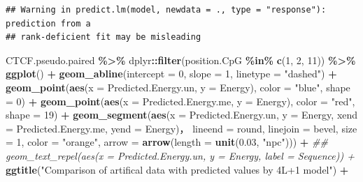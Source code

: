 \documentclass[
]{article}
\newenvironment{Shaded}{\begin{snugshade}}{\end{snugshade}}
\newcommand{\CommentTok}[1]{\textcolor[rgb]{0.56,0.35,0.01}{\textit{#1}}}
\newcommand{\DataTypeTok}[1]{\textcolor[rgb]{0.13,0.29,0.53}{#1}}
\newcommand{\DecValTok}[1]{\textcolor[rgb]{0.00,0.00,0.81}{#1}}
\newcommand{\FloatTok}[1]{\textcolor[rgb]{0.00,0.00,0.81}{#1}}
\newcommand{\KeywordTok}[1]{\textcolor[rgb]{0.13,0.29,0.53}{\textbf{#1}}}
\newcommand{\NormalTok}[1]{#1}
\newcommand{\OperatorTok}[1]{\textcolor[rgb]{0.81,0.36,0.00}{\textbf{#1}}}
\newcommand{\StringTok}[1]{\textcolor[rgb]{0.31,0.60,0.02}{#1}}
\begin{document}
\begin{verbatim}
## Warning in predict.lm(model, newdata = ., type = "response"): prediction from a
## rank-deficient fit may be misleading
\end{verbatim}

\begin{Shaded}
\begin{Highlighting}[]
\NormalTok{CTCF.pseudo.paired }\OperatorTok{\%\textgreater{}\%}
\StringTok{    }\NormalTok{dplyr}\OperatorTok{::}\KeywordTok{filter}\NormalTok{(position.CpG }\OperatorTok{\%in\%}\StringTok{ }\KeywordTok{c}\NormalTok{(}\DecValTok{1}\NormalTok{, }\DecValTok{2}\NormalTok{, }\DecValTok{11}\NormalTok{)) }\OperatorTok{\%\textgreater{}\%}
\StringTok{    }\KeywordTok{ggplot}\NormalTok{() }\OperatorTok{+}
\StringTok{    }\KeywordTok{geom\_abline}\NormalTok{(}\DataTypeTok{intercept =} \DecValTok{0}\NormalTok{, }\DataTypeTok{slope =} \DecValTok{1}\NormalTok{, }\DataTypeTok{linetype =} \StringTok{"dashed"}\NormalTok{) }\OperatorTok{+}
\StringTok{    }\KeywordTok{geom\_point}\NormalTok{(}\KeywordTok{aes}\NormalTok{(}\DataTypeTok{x =}\NormalTok{ Predicted.Energy.un, }\DataTypeTok{y =}\NormalTok{ Energy), }\DataTypeTok{color =} \StringTok{"blue"}\NormalTok{, }\DataTypeTok{shape =} \DecValTok{0}\NormalTok{) }\OperatorTok{+}
\StringTok{    }\KeywordTok{geom\_point}\NormalTok{(}\KeywordTok{aes}\NormalTok{(}\DataTypeTok{x =}\NormalTok{ Predicted.Energy.me, }\DataTypeTok{y =}\NormalTok{ Energy), }\DataTypeTok{color =} \StringTok{"red"}\NormalTok{, }\DataTypeTok{shape =} \DecValTok{19}\NormalTok{) }\OperatorTok{+}
\StringTok{    }\KeywordTok{geom\_segment}\NormalTok{(}\KeywordTok{aes}\NormalTok{(}\DataTypeTok{x =}\NormalTok{ Predicted.Energy.un, }\DataTypeTok{y =}\NormalTok{ Energy,}
                     \DataTypeTok{xend =}\NormalTok{ Predicted.Energy.me, }\DataTypeTok{yend =}\NormalTok{ Energy)，}
                 \DataTypeTok{lineend =} \StringTok{\textquotesingle{}round\textquotesingle{}}\NormalTok{, }\DataTypeTok{linejoin =} \StringTok{\textquotesingle{}bevel\textquotesingle{}}\NormalTok{, }\DataTypeTok{size =} \DecValTok{1}\NormalTok{, }\DataTypeTok{color =} \StringTok{"orange"}\NormalTok{,}
                 \DataTypeTok{arrow =} \KeywordTok{arrow}\NormalTok{(}\DataTypeTok{length =} \KeywordTok{unit}\NormalTok{(}\FloatTok{0.03}\NormalTok{, }\StringTok{"npc"}\NormalTok{))) }\OperatorTok{+}
\StringTok{   }\CommentTok{\#\# geom\_text\_repel(aes(x = Predicted.Energy.un, y = Energy, label = Sequence)) +}
\StringTok{    }\KeywordTok{ggtitle}\NormalTok{(}\StringTok{"Comparison of artifical data with predicted values by 4L+1 model"}\NormalTok{) }\OperatorTok{+}

\end{Highlighting}
\end{Shaded}
\end{document}
